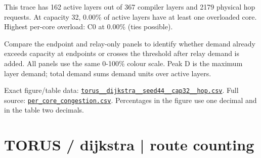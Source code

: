 \documentclass[10pt,a4paper]{article}
\begin{document}
This trace has 162 active layers out of 367 compiler layers and 2179 physical hop requests. At capacity 32, 0.00\% of active layers have at least one overloaded core. Highest per-core overload: C0 at 0.00\% (ties possible).\par
Compare the endpoint and relay-only panels to identify whether demand already exceeds capacity at endpoints or crosses the threshold after relay demand is added. All panels use the same 0-100\% colour scale. Peak D is the maximum layer demand; total demand sums demand units over active layers.\par
Exact figure/table data: \href{\detokenize{file:///home/dhruv-pansuriya/Documents/BTP/Compiler-Driven-ACE/output/pdf/qaoa_methods_congestion/tables/torus__dijkstra__seed44__cap32__hop.csv}}{\nolinkurl{torus__dijkstra__seed44__cap32__hop.csv}}. Full source: \href{\detokenize{file:///home/dhruv-pansuriya/Documents/BTP/Compiler-Driven-ACE/results/qaoa_2seed_2026-10-26/congestion/per_core_congestion.csv}}{\nolinkurl{per_core_congestion.csv}}. Percentages in the figure use one decimal and in the table two decimals.\par
\clearpage
\section*{TORUS / dijkstra | route counting}
\end{document}
